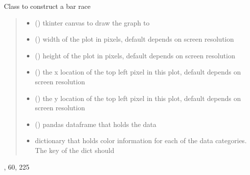 \documentclass[letterpaper,10pt,english]{sphinxmanual}
\begin{document}
\begin{fulllineitems}
\sphinxAtStartPar
Class to construct a bar race
\begin{quote}\begin{description}
\begin{itemize}
\item {} 
\sphinxAtStartPar
{} () \textendash{} tkinter canvas to draw the graph to

\item {} 
\sphinxAtStartPar
{} () \textendash{} width of the plot in pixels, default depends on screen resolution

\item {} 
\sphinxAtStartPar
{} () \textendash{} height of the plot in pixels, default depends on screen resolution

\item {} 
\sphinxAtStartPar
{} () \textendash{} the x location of the top left pixel in this plot, default depends on screen resolution

\item {} 
\sphinxAtStartPar
{} () \textendash{} the y location of the top left pixel in this plot, default depends on screen resolution

\item {} 
\sphinxAtStartPar
{} () \textendash{} pandas dataframe that holds the data

\item {} 
\sphinxAtStartPar
{} \textendash{} dictionary that holds color information for each of the data categories. The key of the dict should

\end{itemize}

\end{description}\end{quote}
\begin{description}
\begin{description}
\sphinxlineitem{\{}\begin{description}
\sphinxlineitem{“United States”: {[}}
,
60,
225


\end{description}
\end{description}
\end{description}
\end{fulllineitems}
\end{document}
